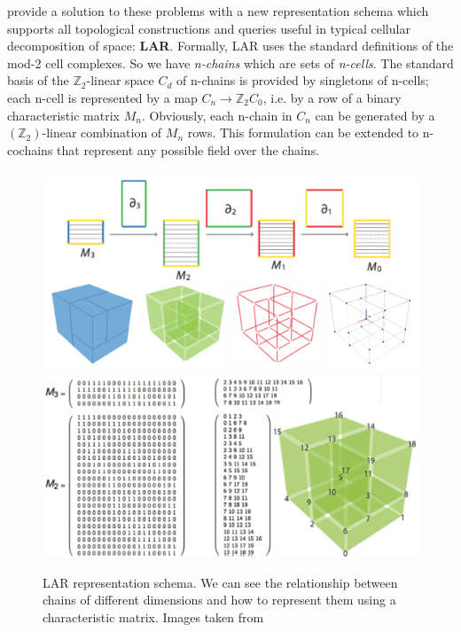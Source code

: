 \cite{DiCarlo} provide a solution to these problems with a new representation schema which supports all topological constructions and queries useful in typical cellular decomposition of space: \textbf{LAR}. Formally, LAR uses the standard definitions of the mod-2 cell complexes. So we have \textit{n-chains} which are sets of \textit{n-cells}. The standard basis of the $\mathbb{Z}_{2}$-linear space $C_{d}$ of n-chains is provided by singletons of n-cells; each n-cell is represented by a map $C_{n} \rightarrow \mathbb{Z}_{2}C_{0}$, i.e. by a row of a binary characteristic matrix $M_{n}$. Obviously, each n-chain in $C_{n}$ can be generated by a $(\mathbb{Z}_{2})$-linear combination of $M_{n}$ rows. This formulation can be extended to n-cochains that represent any possible field over the chains.

\begin{figure}[htb] %
   \centering
   \includegraphics[width=0.75\linewidth]{images/larcomplex.pdf}\\
   \includegraphics[width=0.85\linewidth]{images/larRepresentation.png}
   \caption[LAR representation schema]{LAR representation schema. We can see the relationship between chains of different dimensions and how to represent them using a characteristic matrix. Images taken from \cite{DiCarlo}}
   \label{fig:larRepresentation}
\end{figure}


